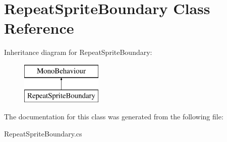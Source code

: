 \hypertarget{class_repeat_sprite_boundary}{}\section{Repeat\+Sprite\+Boundary Class Reference}
\label{class_repeat_sprite_boundary}
Inheritance diagram for Repeat\+Sprite\+Boundary\+:\begin{figure}[H]
\begin{center}
\leavevmode
\includegraphics[height=2.000000cm]{class_repeat_sprite_boundary}
\end{center}
\end{figure}


The documentation for this class was generated from the following file\+:\begin{DoxyCompactItemize}
\item 
Repeat\+Sprite\+Boundary.\+cs\end{DoxyCompactItemize}
